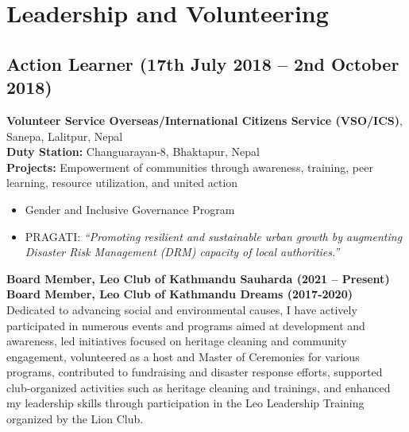 \documentclass[a4paper,10pt]{article}
\begin{document}
\section{Leadership and Volunteering}
\subsection*{Action Learner (17th July 2018 -- 2nd October 2018)}
\textbf{Volunteer Service Overseas/International Citizens Service (VSO/ICS)}, Sanepa, Lalitpur, Nepal\\
\textbf{Duty Station:} Changuarayan-8, Bhaktapur, Nepal\\
\textbf{Projects:} Empowerment of communities through awareness, training, peer learning, resource utilization, and united action\\
\begin{itemize}
    \item Gender and Inclusive Governance Program
    \item PRAGATI: \textit{“Promoting resilient and sustainable urban growth by augmenting Disaster Risk
    Management (DRM) capacity of local authorities.”}
\end{itemize}
\textbf{Board Member, Leo Club of Kathmandu Sauharda (2021 – Present)}\\
\textbf{Board Member, Leo Club of Kathmandu Dreams (2017-2020)}\\
Dedicated to advancing social and environmental causes, I have actively participated in numerous events and programs aimed at development and awareness, led initiatives focused on heritage cleaning and community engagement, volunteered as a host and Master of Ceremonies for various programs, contributed to fundraising and disaster response efforts, supported club-organized activities such as heritage cleaning and trainings, and enhanced my leadership skills through participation in the Leo Leadership Training organized by the Lion Club.
\end{document}
